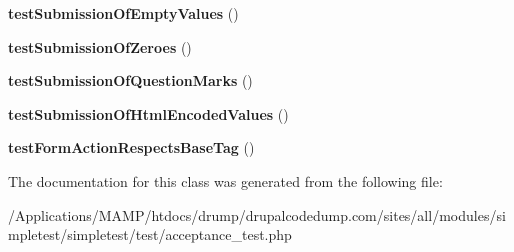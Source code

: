 \begin{DoxyCompactItemize}
\item 
\hypertarget{class_live_test_of_forms_afefa9d54c09b7f9787993de7ed82d337}{
{\bfseries testSubmissionOfEmptyValues} ()}
\label{class_live_test_of_forms_afefa9d54c09b7f9787993de7ed82d337}

\item 
\hypertarget{class_live_test_of_forms_a2313f9c2e7470ef6e8e3ce44ca527b46}{
{\bfseries testSubmissionOfZeroes} ()}
\label{class_live_test_of_forms_a2313f9c2e7470ef6e8e3ce44ca527b46}

\item 
\hypertarget{class_live_test_of_forms_a60a0e5c9969550e6bf165e943313256a}{
{\bfseries testSubmissionOfQuestionMarks} ()}
\label{class_live_test_of_forms_a60a0e5c9969550e6bf165e943313256a}

\item 
\hypertarget{class_live_test_of_forms_a313f1496e30fd0effd801f1e97e37a70}{
{\bfseries testSubmissionOfHtmlEncodedValues} ()}
\label{class_live_test_of_forms_a313f1496e30fd0effd801f1e97e37a70}

\item 
\hypertarget{class_live_test_of_forms_aed1eb8cc397fe83a1010375eee6b6b27}{
{\bfseries testFormActionRespectsBaseTag} ()}
\label{class_live_test_of_forms_aed1eb8cc397fe83a1010375eee6b6b27}

\end{DoxyCompactItemize}


The documentation for this class was generated from the following file:\begin{DoxyCompactItemize}
\item 
/Applications/MAMP/htdocs/drump/drupalcodedump.com/sites/all/modules/simpletest/simpletest/test/acceptance\_\-test.php\end{DoxyCompactItemize}
